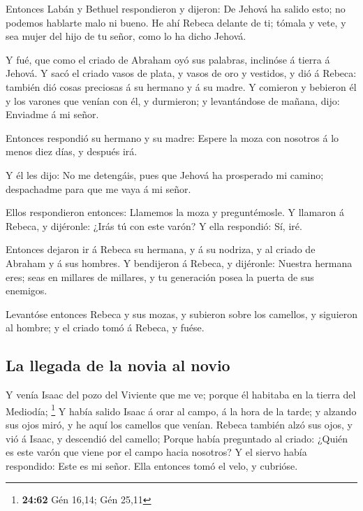  Entonces Labán y Bethuel respondieron y dijeron: De
Jehová ha salido esto; no podemos hablarte malo ni bueno.
 He ahí Rebeca delante de ti; tómala y vete, y sea mujer
del hijo de tu señor, como lo ha dicho Jehová.

 Y fué, que como el criado de Abraham oyó sus palabras,
inclinóse á tierra á Jehová.  Y sacó el criado vasos de
plata, y vasos de oro y vestidos, y dió á Rebeca: también dió cosas
preciosas á su hermano y á su madre.  Y comieron y
bebieron él y los varones que venían con él, y durmieron; y levantándose
de mañana, dijo: Enviadme á mi señor.

 Entonces respondió su hermano y su madre: Espere la moza
con nosotros á lo menos diez días, y después irá.

 Y él les dijo: No me detengáis, pues que Jehová ha
prosperado mi camino; despachadme para que me vaya á mi señor.

 Ellos respondieron entonces: Llamemos la moza y
preguntémosle.  Y llamaron á Rebeca, y dijéronle: ¿Irás
tú con este varón? Y ella respondió: Sí, iré.

 Entonces dejaron ir á Rebeca su hermana, y á su nodriza,
y al criado de Abraham y á sus hombres.  Y bendijeron á
Rebeca, y dijéronle: Nuestra hermana eres; seas en millares de millares,
y tu generación posea la puerta de sus enemigos.

 Levantóse entonces Rebeca y sus mozas, y subieron sobre
los camellos, y siguieron al hombre; y el criado tomó á Rebeca, y fuése.

\hypertarget{la-llegada-de-la-novia-al-novio}{%
\subsection{La llegada de la novia al
novio}\label{la-llegada-de-la-novia-al-novio}}

 Y venía Isaac del pozo del Viviente que me ve; porque él
habitaba en la tierra del Mediodía; \footnote{\textbf{24:62} Gén 16,14;
  Gén 25,11}  Y había salido Isaac á orar al campo, á la
hora de la tarde; y alzando sus ojos miró, y he aquí los camellos que
venían.  Rebeca también alzó sus ojos, y vió á Isaac, y
descendió del camello;  Porque había preguntado al
criado: ¿Quién es este varón que viene por el campo hacia nosotros? Y el
siervo había respondido: Este es mi señor. Ella entonces tomó el velo, y
cubrióse.

